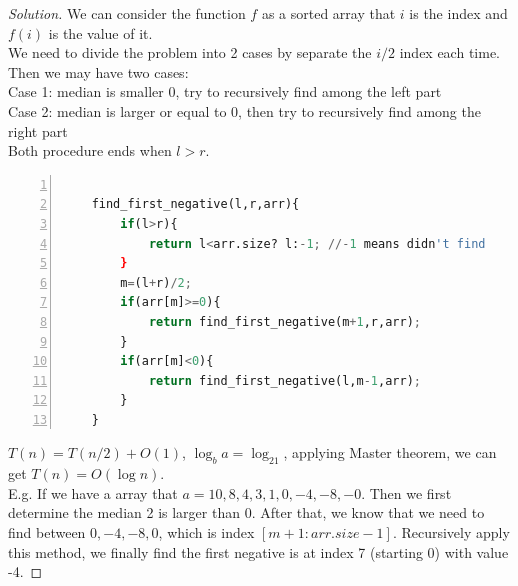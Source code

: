\documentclass[12pt]{article}
\begin{document}
\begin{proof}[Solution]
	We can consider the function $f$ as a sorted array that $i$ is the index and $f(i)$ is the value of it.\\
	We need to divide the problem into 2 cases by separate the $i/2$ index each time. Then we may have two cases:\\
	Case 1: median is smaller 0, try to recursively find among the left part\\
	Case 2: median is larger or equal to 0, then try to recursively find among the right part\\
	Both procedure ends when $l>r$.\\
	\begin{lstlisting}[language={python},numbers=left,numberstyle=\tiny,%frame=shadowbox,  
		rulesepcolor=\color{red!20!green!20!blue!20},  
		keywordstyle=\color{blue!70!black},  
		commentstyle=\color{blue!90!},  
		basicstyle=\ttfamily]  
		
	find_first_negative(l,r,arr){
		if(l>r){
			return l<arr.size? l:-1; //-1 means didn't find
		}
		m=(l+r)/2;
		if(arr[m]>=0){
			return find_first_negative(m+1,r,arr);
		}
		if(arr[m]<0){
			return find_first_negative(l,m-1,arr);
		}
	}
	\end{lstlisting}
	$T(n)=T(n/2)+O(1)$, $\log_ba=\log_21$, applying Master theorem, we can get $T(n)=O(\log n)$.\\
	
	E.g. If we have a array that $a = {10,8,4,3,1,0,-4,-8,-0}$. Then we first determine the median 2 is larger than 0. After that, we know that we need to find between ${0,-4,-8,0}$, which is index $[m+1:arr.size-1]$. Recursively apply this method, we finally find the first negative is at index 7 (starting 0) with value -4.
\end{proof}
\end{document}
